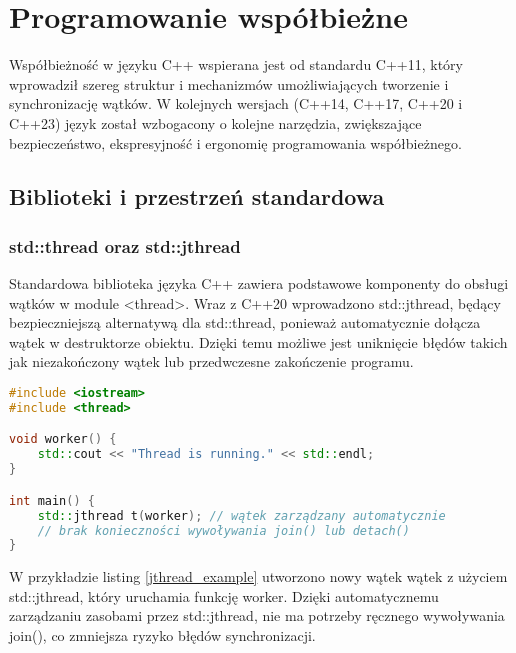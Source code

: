 \section{Programowanie współbieżne}
Współbieżność w języku C++ wspierana jest od standardu C++11, który wprowadził szereg struktur i mechanizmów umożliwiających tworzenie i synchronizację wątków. W kolejnych wersjach (C++14, C++17, C++20 i C++23) język został wzbogacony o kolejne narzędzia, zwiększające bezpieczeństwo, ekspresyjność i ergonomię programowania współbieżnego.

\subsection{Biblioteki i przestrzeń standardowa}
\subsubsection{std::thread oraz std::jthread}
Standardowa biblioteka języka C++ zawiera podstawowe komponenty do obsługi wątków w module <thread>. Wraz z C++20 wprowadzono std::jthread, będący bezpieczniejszą alternatywą dla std::thread, ponieważ automatycznie dołącza wątek w destruktorze obiektu. Dzięki temu możliwe jest uniknięcie błędów takich jak niezakończony wątek   lub przedwczesne zakończenie programu.

\begin{lstlisting}[language=C++, caption={Przykład użycia std::jthread}, label={jthread_example}]
#include <iostream>
#include <thread>

void worker() {
    std::cout << "Thread is running." << std::endl;
}

int main() {
    std::jthread t(worker); // wątek zarządzany automatycznie
    // brak konieczności wywoływania join() lub detach()
}
\end{lstlisting}    
W przykładzie listing \ref{jthread_example} utworzono nowy wątek wątek z użyciem std::jthread, który uruchamia funkcję worker. Dzięki automatycznemu zarządzaniu zasobami przez std::jthread, nie ma potrzeby ręcznego wywoływania join(), co zmniejsza ryzyko błędów synchronizacji.


